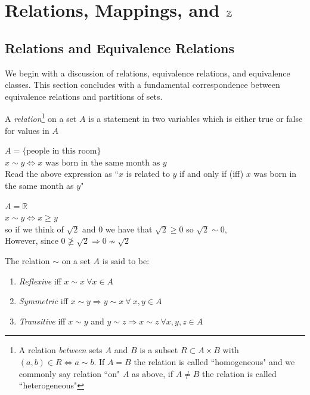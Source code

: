 


\chapter{\texorpdfstring{Relations, Mappings, and ${\mathbb{Z}}$}{Relations, Mappings, and Z (integers)}}
\vspace{-0.25 in}
\section{Relations and Equivalence Relations}
We begin with a discussion of relations, equivalence relations, and equivalence classes. This
section concludes with a fundamental correspondence between equivalence relations and partitions of
sets.
\begin{definition}[Relations]
A \textit{relation}\footnote{
    A relation \textit{between} sets $A$ and $B$ is a subset $R\subset A\times B$ with
    $(a,b)\in R \iff a\sim b $. If $A=B$ the relation is called ``homogeneous" and we commonly say
    relation ``on" $A$ as above, if $A\neq B$ the relation is called ``heterogeneous"
} on a set $A$ is a statement in two variables which is either true or false for values in $A$
\end{definition}
\begin{example}
\label{ex:firstExample}
$A=\{\text{people in this room}\}$\\
$x\sim y \Leftrightarrow x \text{ was born in the same month as } y$\\
Read the above expression as ``$x$ is related to $y$ if and only if (iff) $x$ was born in the same
month as $y$"
\end{example}
\begin{example}
    \label{ex:secondExample}
$A=\mathbb{R}$\\
$x\sim y \Leftrightarrow x \geq y$\\
so if we think of $\sqrt{2}$ and $0$ we have that $\sqrt{2}\geq 0$ so $\sqrt{2}\sim 0$, \\
However, since $0 \not\geq \sqrt{2} \Rightarrow 0\not\sim \sqrt{2}$
\end{example}
\begin{definition}
The relation $\sim$ on a set $A$ is said to be:
\begin{enumerate}[label=\roman*)]
    \item \textit{Reflexive} iff $x\sim x \ \forall x \in A$
    \item \textit{Symmetric} iff $x\sim y \Rightarrow y\sim x \ \forall \ x,y \in A$
    \item \textit{Transitive} iff $x\sim y$ and $y\sim z \Rightarrow x\sim z \ \forall x,y,z \in A$
\end{enumerate}
\end{definition}
